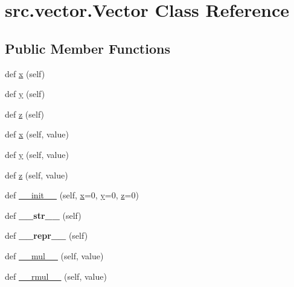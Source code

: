 \hypertarget{classsrc_1_1vector_1_1Vector}{}\section{src.\+vector.\+Vector Class Reference}
\label{classsrc_1_1vector_1_1Vector}
\subsection*{Public Member Functions}
\begin{DoxyCompactItemize}
\item 
def \hyperlink{classsrc_1_1vector_1_1Vector_aaca4ddfa8442cd4f0206919fe392d5fc}{x} (self)
\item 
def \hyperlink{classsrc_1_1vector_1_1Vector_a9c713a7446061715b080c9c8378a9ef5}{y} (self)
\item 
def \hyperlink{classsrc_1_1vector_1_1Vector_ad5748eb92e6740c1b7f59dd49427c1a4}{z} (self)
\item 
def \hyperlink{classsrc_1_1vector_1_1Vector_a678951acddfb07e239e0e0e0264bdc79}{x} (self, value)
\item 
def \hyperlink{classsrc_1_1vector_1_1Vector_a5092574be2347f8180ad075d02bed8a4}{y} (self, value)
\item 
def \hyperlink{classsrc_1_1vector_1_1Vector_aa2556d0f66ff3fa60b36c15fe8b41152}{z} (self, value)
\item 
def \hyperlink{classsrc_1_1vector_1_1Vector_a2f63fb5ba898c0934b16c7fcc3f810b9}{\+\_\+\+\_\+init\+\_\+\+\_\+} (self, \hyperlink{classsrc_1_1vector_1_1Vector_aaca4ddfa8442cd4f0206919fe392d5fc}{x}=0, \hyperlink{classsrc_1_1vector_1_1Vector_a9c713a7446061715b080c9c8378a9ef5}{y}=0, \hyperlink{classsrc_1_1vector_1_1Vector_ad5748eb92e6740c1b7f59dd49427c1a4}{z}=0)
\item 
\mbox{\label{classsrc_1_1vector_1_1Vector_a40a0e7f46a4ff6c8536d41fe4a8729a2}} 
def {\bfseries \+\_\+\+\_\+str\+\_\+\+\_\+} (self)
\item 
\mbox{\label{classsrc_1_1vector_1_1Vector_af36d5e7fd7fa207bc7edc605f5191c6f}} 
def {\bfseries \+\_\+\+\_\+repr\+\_\+\+\_\+} (self)
\item 
def \hyperlink{classsrc_1_1vector_1_1Vector_abab8effde8519377951a7076e14336ea}{\+\_\+\+\_\+mul\+\_\+\+\_\+} (self, value)
\item 
def \hyperlink{classsrc_1_1vector_1_1Vector_a6647e501e089faedfb3ad372a8c3131f}{\+\_\+\+\_\+rmul\+\_\+\+\_\+} (self, value)

\end{DoxyCompactItemize}
